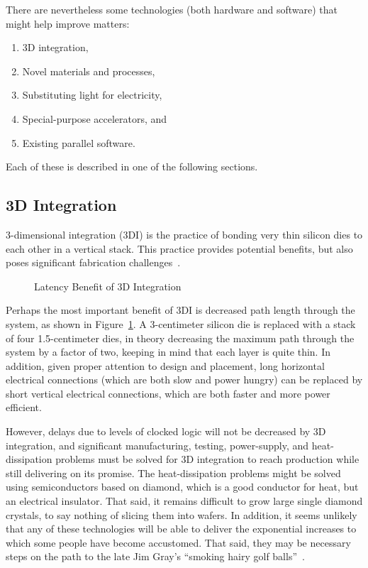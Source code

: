 There are nevertheless some technologies (both hardware and software)
that might help improve matters:

\begin{enumerate}
\item	3D integration,
\item	Novel materials and processes,
\item	Substituting light for electricity,
\item	Special-purpose accelerators, and
\item	Existing parallel software.
\end{enumerate}

Each of these is described in one of the following sections.

\subsection{3D Integration}
\label{sec:cpu:3D Integration}

3-dimensional integration (3DI) is the practice of bonding
very thin silicon dies to each other in a vertical stack.
This practice provides potential benefits, but also poses
significant fabrication challenges~\cite{JohnKnickerbocker2008:3DI}.

\begin{figure}[tb]
\centering
{}
\caption{Latency Benefit of 3D Integration}
\label{fig:cpu:Latency Benefit of 3D Integration}
\end{figure}

Perhaps the most important benefit of 3DI is decreased path length through
the system, as shown in
Figure~\ref{fig:cpu:Latency Benefit of 3D Integration}.
A 3-centimeter silicon die is replaced with a stack of four 1.5-centimeter
dies, in theory decreasing the maximum path through the system by a factor
of two, keeping in mind that each layer is quite thin.
In addition, given proper attention to design and placement,
long horizontal electrical connections (which are both slow and
power hungry) can be replaced by short vertical electrical connections,
which are both faster and more power efficient.

However, delays due to levels of clocked logic will not be decreased
by 3D integration, and significant manufacturing, testing, power-supply,
and heat-dissipation problems must be solved for 3D integration to
reach production while still delivering on its promise.
The heat-dissipation problems might be solved using
semiconductors based on diamond, which is a good conductor
for heat, but an electrical insulator.
That said, it remains difficult to grow large single diamond crystals,
to say nothing of slicing them into wafers.
In addition, it seems unlikely that any of these technologies will be able to
deliver the exponential increases to which some people have become accustomed.
That said, they may be necessary steps on the path to the late Jim Gray's
``smoking hairy golf balls''~\cite{JimGray2002SmokingHairyGolfBalls}.

